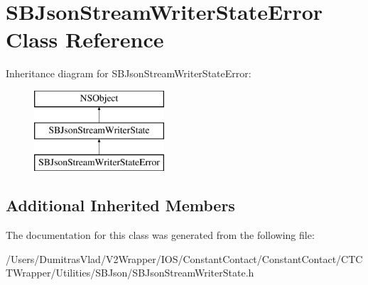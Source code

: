 \hypertarget{interface_s_b_json_stream_writer_state_error}{\section{S\-B\-Json\-Stream\-Writer\-State\-Error Class Reference}
\label{interface_s_b_json_stream_writer_state_error}
}
Inheritance diagram for S\-B\-Json\-Stream\-Writer\-State\-Error\-:\begin{figure}[H]
\begin{center}
\leavevmode
\includegraphics[height=3.000000cm]{interface_s_b_json_stream_writer_state_error}
\end{center}
\end{figure}
\subsection*{Additional Inherited Members}


The documentation for this class was generated from the following file\-:\begin{DoxyCompactItemize}
\item 
/\-Users/\-Dumitras\-Vlad/\-V2\-Wrapper/\-I\-O\-S/\-Constant\-Contact/\-Constant\-Contact/\-C\-T\-C\-T\-Wrapper/\-Utilities/\-S\-B\-Json/S\-B\-Json\-Stream\-Writer\-State.\-h\end{DoxyCompactItemize}
